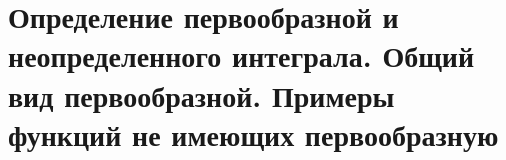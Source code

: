 \section{Определение первообразной и неопределенного интеграла. Общий вид первообразной. Примеры функций не имеющих первообразную}
